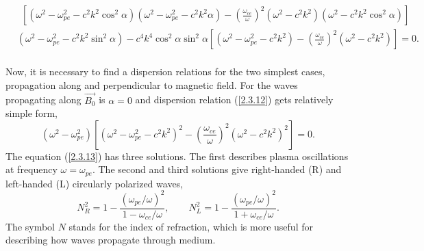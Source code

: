 \begin{equation}
\begin{split}
\label{2.3.12}
& \ \ \left[ \left( \omega^{2} - \omega_{pe}^{2} - c^{2} k^{2} \cos^{2} \alpha \right) \left( \omega^{2} - \omega_{pe}^{2} - c^{2} k^{2} \alpha \right) - \left(  \frac{\omega_{ce}}{\omega} \right)^{2} \left( \omega^{2} - c^{2} k^{2} \right) \left( \omega^{2} - c^{2} k^{2} \cos^{2} \alpha \right) \right]\\[5pt]
& \left( \omega^{2} - \omega_{pe}^{2} - c^{2} k^{2} \sin^{2} \alpha \right) - c^{4} k^{4} \cos^{2} \alpha \sin^{2} \alpha \left[ \left( \omega^{2} - \omega_{pe}^{2} - c^{2} k^{2} \right) - \left( \frac{\omega_{ce}}{\omega} \right)^{2} \left( \omega^{2} - c^{2} k^{2} \right) \right] = 0.\\[5pt]
\end{split}
\end{equation}

Now, it is necessary to find a dispersion relations for the two simplest cases, propagation along and perpendicular to magnetic field. For the waves propagating along $ \vec{B_{0}} $ is $ \alpha = 0 $ and dispersion relation (\ref{2.3.12}) gets relatively simple form,
\begin{equation}
\label{2.3.13}
\left( \omega^{2} - \omega_{pe}^{2} \right) \left[ \left( \omega^{2} - \omega_{pe}^{2} - c^{2} k^{2} \right)^{2}  - \left( \frac{\omega_{ce}}{\omega} \right)^{2} \left( \omega^{2} - c^{2} k^{2} \right)^{2} \right] = 0.
\end{equation}
The equation (\ref{2.3.13}) has three solutions. The first describes plasma oscillations at frequency $ \omega = \omega_{pe} $. The second and third solutions give right-handed (R) and left-handed (L) circularly polarized waves,
\begin{equation}
\label{2.3.14}
N_{R}^{2} = 1 - \frac{\left( \omega_{pe} / \omega\right)^{2} }{1 - \omega_{ce} / \omega}, \qquad N_{L}^{2} = 1 - \frac{\left( \omega_{pe} / \omega\right)^{2} }{1 + \omega_{ce} / \omega}.
\end{equation}
The symbol $ N $ stands for the index of refraction, which is more useful for describing how waves propagate through medium.

